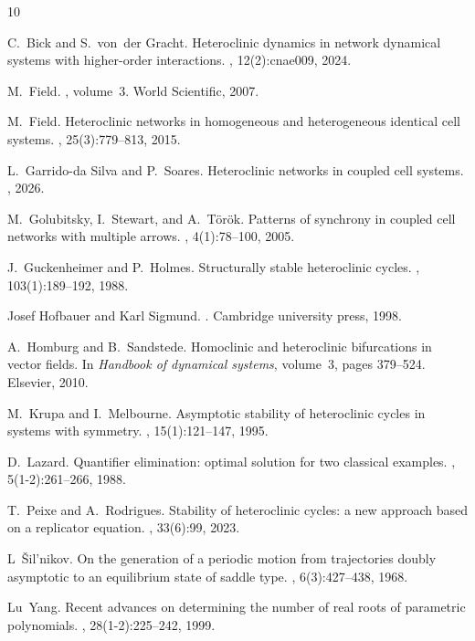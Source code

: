 \documentclass{article}
\theoremstyle{definition}
\begin{document}
 
\begin{thebibliography}{10}

C.~Bick and S.~von~der Gracht.
\newblock Heteroclinic dynamics in network dynamical systems with higher-order interactions.
, 12(2):cnae009, 2024.

M.~Field.
, volume~3.
\newblock World Scientific, 2007.

M.~Field.
\newblock Heteroclinic networks in homogeneous and heterogeneous identical cell systems.
, 25(3):779--813, 2015.

L.~Garrido-da Silva and P.~Soares.
\newblock Heteroclinic networks in coupled cell systems.
, 2026.

M.~Golubitsky, I.~Stewart, and A.~T{\"o}r{\"o}k.
\newblock Patterns of synchrony in coupled cell networks with multiple arrows.
, 4(1):78--100, 2005.

J.~Guckenheimer and P.~Holmes.
\newblock Structurally stable heteroclinic cycles.
, 103(1):189–192, 1988.

Josef Hofbauer and Karl Sigmund.
.
\newblock Cambridge university press, 1998.

A.~Homburg and B.~Sandstede.
\newblock Homoclinic and heteroclinic bifurcations in vector fields.
\newblock In {\em Handbook of dynamical systems}, volume~3, pages 379--524. Elsevier, 2010.

M.~Krupa and I.~Melbourne.
\newblock Asymptotic stability of heteroclinic cycles in systems with symmetry.
, 15(1):121–147, 1995.

D.~Lazard.
\newblock Quantifier elimination: optimal solution for two classical examples.
, 5(1-2):261--266, 1988.

T.~Peixe and A.~Rodrigues.
\newblock Stability of heteroclinic cycles: a new approach based on a replicator equation.
, 33(6):99, 2023.

L~{\v{S}}il'nikov.
\newblock On the generation of a periodic motion from trajectories doubly asymptotic to an equilibrium state of saddle type.
, 6(3):427--438, 1968.

Lu~Yang.
\newblock Recent advances on determining the number of real roots of parametric polynomials.
, 28(1-2):225--242, 1999.

\end{thebibliography}
\end{document}
